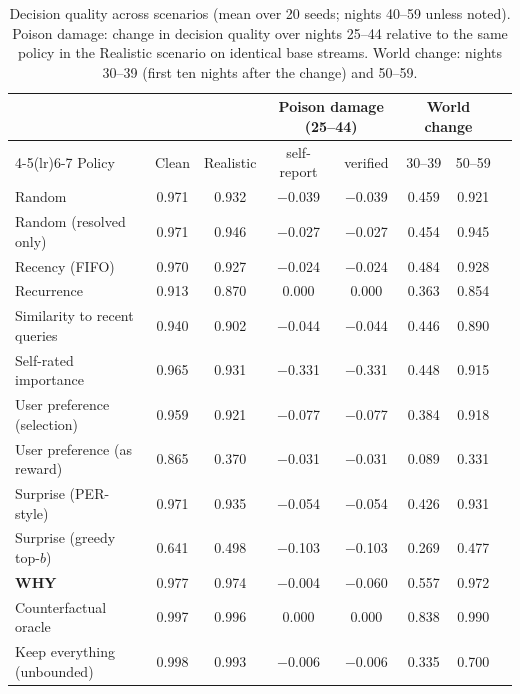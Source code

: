 \begin{table}[t]
\centering\small
\caption{Decision quality across scenarios (mean over 20 seeds; nights 40--59 unless noted). Poison damage: change in decision quality over nights 25--44 relative to the same policy in the Realistic scenario on identical base streams. World change: nights 30--39 (first ten nights after the change) and 50--59.}
\label{tab:scenarios}
\setlength{\tabcolsep}{4.5pt}
\begin{tabular}{@{}lccccccc@{}}
\toprule
& & & \multicolumn{2}{c}{Poison damage (25--44)} & \multicolumn{2}{c}{World change} \\
\cmidrule(lr){4-5}\cmidrule(lr){6-7}
Policy & Clean & Realistic & self-report & verified & 30--39 & 50--59\\
\midrule
Random & 0.971 & 0.932 & $-$0.039 & $-$0.039 & 0.459 & 0.921\\
Random (resolved only) & 0.971 & 0.946 & $-$0.027 & $-$0.027 & 0.454 & 0.945\\
Recency (FIFO) & 0.970 & 0.927 & $-$0.024 & $-$0.024 & 0.484 & 0.928\\
Recurrence & 0.913 & 0.870 & 0.000 & 0.000 & 0.363 & 0.854\\
Similarity to recent queries & 0.940 & 0.902 & $-$0.044 & $-$0.044 & 0.446 & 0.890\\
Self-rated importance & 0.965 & 0.931 & $-$0.331 & $-$0.331 & 0.448 & 0.915\\
User preference (selection) & 0.959 & 0.921 & $-$0.077 & $-$0.077 & 0.384 & 0.918\\
User preference (as reward) & 0.865 & 0.370 & $-$0.031 & $-$0.031 & 0.089 & 0.331\\
Surprise (PER-style) & 0.971 & 0.935 & $-$0.054 & $-$0.054 & 0.426 & 0.931\\
Surprise (greedy top-$b$) & 0.641 & 0.498 & $-$0.103 & $-$0.103 & 0.269 & 0.477\\
\textbf{WHY} & 0.977 & 0.974 & $-$0.004 & $-$0.060 & 0.557 & 0.972\\
\midrule
Counterfactual oracle & 0.997 & 0.996 & 0.000 & 0.000 & 0.838 & 0.990\\
Keep everything (unbounded) & 0.998 & 0.993 & $-$0.006 & $-$0.006 & 0.335 & 0.700\\
\bottomrule
\end{tabular}
\end{table}
